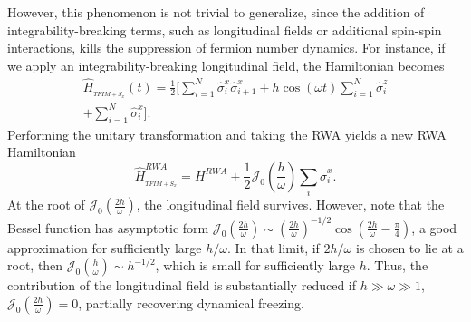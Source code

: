 \documentclass[%
reprint,
superscriptaddress,
amsmath,amssymb,
aps,
prb,
showkeys,
]{revtex4-2}
\begin{document}
	However, this phenomenon is not trivial to generalize, since the addition of integrability-breaking terms, such as longitudinal fields or additional spin-spin interactions, kills the suppression of fermion number dynamics.  For instance, if we apply an integrability-breaking longitudinal field, the Hamiltonian becomes 
	\begin{multline}
		\hat{H}_{_{TFIM+S_{x}}}(t) =\frac12 \Big[\sum^N_{i=1}  \hat{\sigma}_{i}^{x} \hat{\sigma}_{i+1}^{x}+h \cos (\omega t) \sum^N_{i=1} \hat{\sigma}_{i}^{z}\\
		+\sum^N_{i=1} \hat{\sigma}_{i}^{x}\Big].
		\label{eq:tfim_sx}
	\end{multline}	
	Performing the unitary transformation and taking the RWA yields a new RWA Hamiltonian
	\begin{equation}
		\hat{H}_{_{TFIM+S_{x}}}^{R W A}= H^{RWA}+\frac12 \mathcal{J}_{0}\left(\frac{h}{\omega}\right) \sum_i\hat{\sigma}^x_i.
		\label{eq:tfim_sx1}
	\end{equation}
	At the root of $\mathcal{J}_0\left(\frac{2h}{\omega}\right)$, the longitudinal field survives. However, note that the Bessel function has asymptotic form $\mathcal{J}_0\left(\frac{2h}{\omega}\right)\sim \left(\frac{2h}{\omega}\right)^{-1/2}\cos\left(\frac{2h}{\omega}-\frac{\pi}{4}\right)$, a good approximation for sufficiently  large $h/\omega$. In that limit, if $2h/\omega$ is chosen to lie at a root, then $\mathcal{J}_0\left(\frac{h}{\omega}\right) \sim h^{-1/2}$, which is small for sufficiently large $h$. Thus, the contribution of the longitudinal field is substantially reduced if $h\gg\omega\gg1$, $\mathcal{J}_0\left(\frac{2h}{\omega}\right)=0$, partially recovering dynamical freezing.
\end{document}
